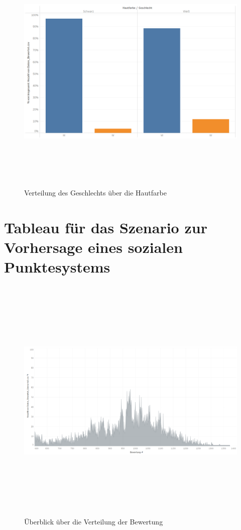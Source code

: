 \documentclass[a4paper,12pt]{report}
\begin{document}
\begin{figure}[!h]
    \centering
    \includegraphics[width=16cm,height=12cm]{Diagramme/SZ1_Tab10.PNG}
    \caption{Verteilung des Geschlechts über die Hautfarbe}
    \label{fig:SZ1Tab10}
\end{figure}

    \chapter{Tableau für das Szenario zur Vorhersage eines sozialen Punktesystems}

\begin{figure}[!h]
    \centering
    \includegraphics[width=16cm,height=12cm]{Diagramme/SZ2_Tab1.PNG}
    \caption{Überblick über die Verteilung der Bewertung}
    \label{fig:SZ2Tab1}
\end{figure}
\end{document}
